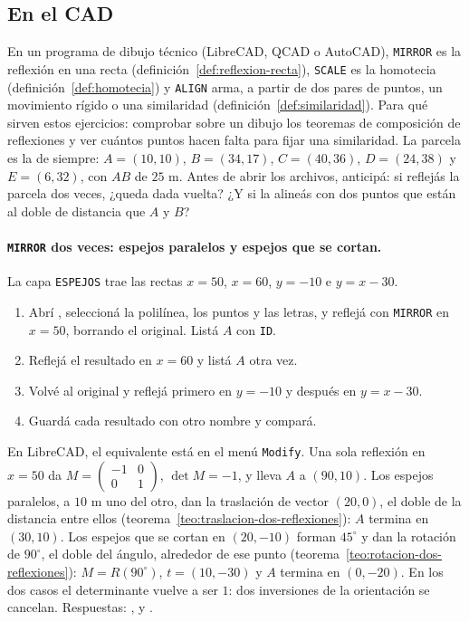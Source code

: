 \subsection{En el CAD}\label{sec:cad-cap03}

En un programa de dibujo técnico (LibreCAD, QCAD o AutoCAD), \texttt{MIRROR} es la reflexión en
una recta (definición~\ref{def:reflexion-recta}), \texttt{SCALE} es la homotecia
(definición~\ref{def:homotecia}) y \texttt{ALIGN} arma, a partir de dos pares de puntos, un
movimiento rígido o una similaridad (definición~\ref{def:similaridad}). Para qué sirven estos
ejercicios: comprobar sobre un dibujo los teoremas de composición de reflexiones y ver cuántos
puntos hacen falta para fijar una similaridad. La parcela es la de siempre: \(A=(10,10)\),
\(B=(34,17)\), \(C=(40,36)\), \(D=(24,38)\) y \(E=(6,32)\), con \(AB\) de \(25\) m. Antes de
abrir los archivos, anticipá: si reflejás la parcela dos veces, ¿queda dada vuelta? ¿Y si la
alineás con dos puntos que están al doble de distancia que \(A\) y \(B\)?

\paragraph{\texttt{MIRROR} dos veces: espejos paralelos y espejos que se cortan.} La capa
\texttt{ESPEJOS} trae las rectas \(x=50\), \(x=60\), \(y=-10\) e \(y=x-30\).
\begin{enumerate}
  \item Abrí , seleccioná la polilínea, los puntos y las letras, y
  reflejá con \texttt{MIRROR} en \(x=50\), borrando el original. Listá \(A\) con \texttt{ID}.
  \item Reflejá el resultado en \(x=60\) y listá \(A\) otra vez.
  \item Volvé al original y reflejá primero en \(y=-10\) y después en \(y=x-30\).
  \item Guardá cada resultado con otro nombre y compará.
\end{enumerate}
En LibreCAD, el equivalente está en el menú \texttt{Modify}. Una sola reflexión en \(x=50\) da
\(M=\left(\begin{smallmatrix}-1&0\\0&1\end{smallmatrix}\right)\), \(\det M=-1\), y lleva \(A\)
a \((90,10)\). Los espejos paralelos, a \(10\) m uno del otro, dan la traslación de vector
\((20,0)\), el doble de la distancia entre ellos (teorema~\ref{teo:traslacion-dos-reflexiones}):
\(A\) termina en \((30,10)\). Los espejos que se cortan en \((20,-10)\) forman \(45^\circ\) y
dan la rotación de \(90^\circ\), el doble del ángulo, alrededor de ese punto
(teorema~\ref{teo:rotacion-dos-reflexiones}): \(M=R(90^\circ)\), \(t=(10,-30)\) y \(A\)
termina en \((0,-20)\). En los dos casos el determinante vuelve a ser \(1\): dos inversiones de
la orientación se cancelan. Respuestas: ,
 y .


